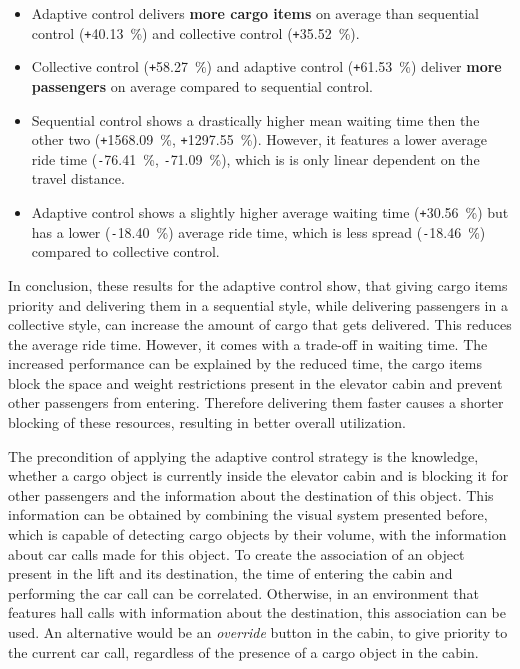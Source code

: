 \begin{itemize}
    \item Adaptive control delivers \textbf{more cargo items} on average than sequential control (\texttt{+}40.13~\%) and collective control (\texttt{+}35.52~\%).
    \item Collective control (\texttt{+}58.27~\%) and adaptive control (\texttt{+}61.53~\%) deliver \textbf{more passengers} on average compared to sequential control. 
    \item Sequential control shows a drastically higher mean waiting time then the other two (\texttt{+}1568.09~\%, \texttt{+}1297.55~\%). However, it features a lower average ride time (\texttt{-}76.41~\%, \texttt{-}71.09~\%), which is is only linear dependent on the travel distance.
    \item Adaptive control shows a slightly higher average waiting time (\texttt{+}30.56~\%) but has a lower (\texttt{-}18.40~\%) average ride time, which is less spread (\texttt{-}18.46~\%) compared to collective control.
\end{itemize}

In conclusion, these results for the adaptive control show, that giving cargo items priority and delivering them in a sequential style, while delivering passengers in a collective style, 
can increase the amount of cargo that gets delivered. 
This reduces the average ride time. 
However, it comes with a trade-off in waiting time.
The increased performance can be explained by the reduced time, 
the cargo items block the space and weight restrictions present in the elevator cabin and prevent other passengers from entering.
Therefore delivering them faster causes a shorter blocking of these resources, resulting in better overall utilization.

The precondition of applying the adaptive control strategy is the knowledge, 
whether a cargo object is currently inside the elevator cabin and is blocking it for other passengers 
and the information about the destination of this object.
This information can be obtained by combining the visual system presented before, which is capable of detecting cargo objects by their volume, with the information about car calls made for this object. To create the association of an object present in the lift and its destination, 
the time of entering the cabin and performing the car call can be correlated.
Otherwise, in an environment that features hall calls with information about the destination, this association can be used.
An alternative would be an \emph{override} button in the cabin, 
to give priority to the current car call, regardless of the presence of a cargo object in the cabin.

